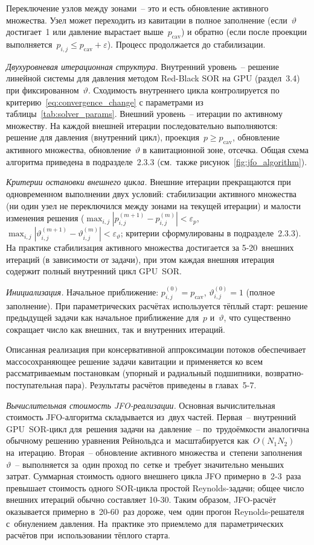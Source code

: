 Переключение узлов между зонами~-- это и есть обновление активного множества. Узел может переходить из кавитации в полное заполнение (если~$\vartheta$ достигает~1 или давление вырастает выше~$p_{\mathrm{cav}}$) и обратно (если после проекции выполняется~$p_{i,j} \leq p_{\mathrm{cav}} + \varepsilon$). Процесс продолжается до стабилизации.

\textit{Двухуровневая итерационная структура.}
Внутренний уровень~-- решение линейной системы для давления методом Red-Black SOR на GPU (раздел~3.4) при фиксированном~$\vartheta$. Сходимость внутреннего цикла контролируется по критерию~\eqref{eq:convergence_change} с параметрами из таблицы~\ref{tab:solver_params}. Внешний уровень~-- итерации по активному множеству. На каждой внешней итерации последовательно выполняются: решение для давления (внутренний цикл), проекция~$p \geq p_{\mathrm{cav}}$, обновление активного множества, обновление~$\vartheta$ в кавитационной зоне, отсечка. Общая схема алгоритма приведена в подразделе~2.3.3 (см.\ также рисунок~\ref{fig:jfo_algorithm}).

\textit{Критерии остановки внешнего цикла.}
Внешние итерации прекращаются при одновременном выполнении двух условий: стабилизации активного множества (ни один узел не переключился между зонами на текущей итерации) и малости изменения решения ($\max_{i,j} |p_{i,j}^{(m+1)} - p_{i,j}^{(m)}| < \varepsilon_p$, $\max_{i,j} |\vartheta_{i,j}^{(m+1)} - \vartheta_{i,j}^{(m)}| < \varepsilon_\vartheta$; критерии сформулированы в подразделе~2.3.3). На практике стабилизация активного множества достигается за 5-20~внешних итераций (в зависимости от задачи), при этом каждая внешняя итерация содержит полный внутренний цикл GPU~SOR.

\textit{Инициализация.}
Начальное приближение: $p^{(0)}_{i,j} = p_{\mathrm{cav}}$, $\vartheta^{(0)}_{i,j} = 1$ (полное заполнение). При параметрических расчётах используется тёплый старт: решение предыдущей задачи как начальное приближение для~$p$ и~$\vartheta$, что существенно сокращает число как внешних, так и внутренних итераций.

Описанная реализация при консервативной аппроксимации потоков обеспечивает массосохраняющее решение задачи кавитации и применяется ко всем рассматриваемым постановкам (упорный и радиальный подшипники, возвратно-поступательная пара). Результаты расчётов приведены в главах~5-7.

\textit{Вычислительная стоимость JFO-реализации.}
Основная вычислительная стоимость JFO-алгоритма складывается из~двух частей. Первая~-- внутренний GPU~SOR-цикл для~решения задачи на~давление~-- по~трудоёмкости аналогична обычному решению уравнения Рейнольдса и~масштабируется как~$O(N_1 N_2)$ на~итерацию. Вторая~-- обновление активного множества и~степени заполнения~$\vartheta$~-- выполняется за~один проход по~сетке и~требует значительно меньших затрат. Суммарная стоимость одного внешнего цикла JFO примерно в~2-3~раза превышает стоимость одного SOR-цикла простой Reynolds-задачи; общее число внешних итераций обычно составляет 10-30. Таким образом, JFO-расчёт оказывается примерно в~20-60~раз дороже, чем~один прогон Reynolds-решателя с~обнулением давления. На~практике это приемлемо для~параметрических расчётов при~использовании тёплого старта.

